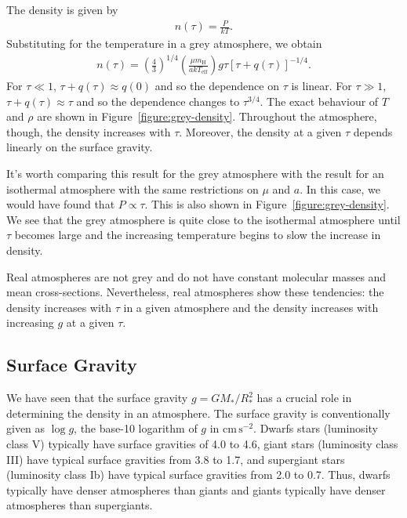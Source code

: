 The density is given by
\begin{align}
n(\tau) = \frac{P}{kT}.
\end{align}
Substituting for the temperature in a grey atmosphere, we obtain
\begin{align}
n(\tau) = \left(\frac43\right)^{1/4}\left(\frac{\mu m_\mathrm{H}}{a kT_\mathrm{eff}}\right) g\tau\left[\tau + q(\tau)\right]^{-1/4}.
\end{align}
For $\tau\ll1$, $\tau + q(\tau)\approx q(0)$ and so the dependence on $\tau$ is linear. For $\tau \gg 1$, $\tau + q(\tau) \approx \tau$ and so the dependence changes to $\tau^{3/4}$. The exact behaviour of $T$ and $\rho$ are shown in Figure~\ref{figure:grey-density}. Throughout the atmosphere, though, the density increases with $\tau$. Moreover, the density at a given $\tau$ depends linearly on the surface gravity.

It’s worth comparing this result for the grey atmosphere with the result for an isothermal atmosphere with the same restrictions on $\mu$ and $a$. In this case, we would have found that $P \propto \tau$. This is also shown in Figure~\ref{figure:grey-density}. We see that the grey atmosphere is quite close to the isothermal atmosphere until $\tau$ becomes large and the increasing temperature begins to slow the increase in density.

Real atmospheres are not grey and do not have constant molecular masses and mean cross-sections. Nevertheless, real atmospheres show these tendencies: the density increases with $\tau$ in a given atmosphere and the density increases with increasing $g$ at a given $\tau$. 

\newslide

\subsection{Surface Gravity}

We have seen that the surface gravity $g = GM_*/R_*^2$ has a crucial role in determining the density in an atmosphere. The surface gravity is conventionally given as $\log g$, the base-10 logarithm of $g$ in $\mathrm{cm\,s^{-2}}$. Dwarfs stars (luminosity class V) typically have surface gravities of 4.0 to 4.6, giant stars (luminosity class III) have typical surface gravities from 3.8 to 1.7, and supergiant stars (luminosity class Ib) have typical surface gravities from 2.0 to 0.7. Thus, dwarfs typically have denser atmospheres than giants and giants typically have denser atmospheres than supergiants.

